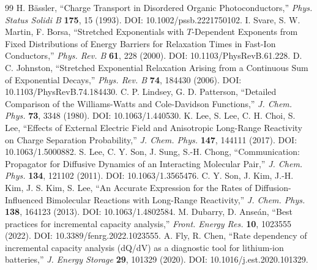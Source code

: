 \documentclass[11pt,a4paper]{article}
\begin{document}
\begin{thebibliography}{99}
 H. B\"assler, ``Charge Transport in Disordered Organic Photoconductors,''
  \emph{Phys. Status Solidi B} \textbf{175}, 15 (1993). DOI: 10.1002/pssb.2221750102.
 I. Svare, S. W. Martin, F. Borsa, ``Stretched Exponentials with $T$-Dependent
  Exponents from Fixed Distributions of Energy Barriers for Relaxation Times in Fast-Ion Conductors,''
  \emph{Phys. Rev. B} \textbf{61}, 228 (2000). DOI: 10.1103/PhysRevB.61.228.
 D. C. Johnston, ``Stretched Exponential Relaxation Arising from a Continuous Sum
  of Exponential Decays,'' \emph{Phys. Rev. B} \textbf{74}, 184430 (2006). DOI: 10.1103/PhysRevB.74.184430.
 C. P. Lindsey, G. D. Patterson, ``Detailed Comparison of the Williams-Watts and
  Cole-Davidson Functions,'' \emph{J. Chem. Phys.} \textbf{73}, 3348 (1980). DOI: 10.1063/1.440530.
 K. Lee, S. Lee, C. H. Choi, S. Lee, ``Effects of External Electric Field and Anisotropic Long-Range Reactivity on Charge Separation Probability,''
  \emph{J. Chem. Phys.} \textbf{147}, 144111 (2017). DOI: 10.1063/1.5000882.
 S. Lee, C. Y. Son, J. Sung, S.-H. Chong, ``Communication: Propagator for Diffusive Dynamics of an Interacting Molecular Pair,''
  \emph{J. Chem. Phys.} \textbf{134}, 121102 (2011). DOI: 10.1063/1.3565476.
 C. Y. Son, J. Kim, J.-H. Kim, J. S. Kim, S. Lee, ``An Accurate Expression for the Rates of Diffusion-Influenced Bimolecular Reactions with Long-Range Reactivity,''
  \emph{J. Chem. Phys.} \textbf{138}, 164123 (2013). DOI: 10.1063/1.4802584.
 M. Dubarry, D. Anseán, ``Best practices for incremental capacity analysis,''
  \emph{Front. Energy Res.} \textbf{10}, 1023555 (2022). DOI: 10.3389/fenrg.2022.1023555.
 A. Fly, R. Chen, ``Rate dependency of incremental capacity analysis (dQ/dV) as a diagnostic tool for lithium-ion batteries,''
  \emph{J. Energy Storage} \textbf{29}, 101329 (2020). DOI: 10.1016/j.est.2020.101329.
\end{thebibliography}
\end{document}

